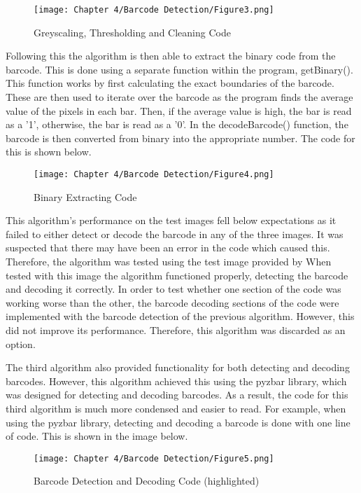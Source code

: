 \begin{figure}[H]        
    \centering
    \texttt{[image: Chapter 4/Barcode Detection/Figure3.png]}
    \caption{Greyscaling, Thresholding and Cleaning Code}
    \label{fig:bc3}
\end{figure} 

Following this the algorithm is then able to extract the binary code from the barcode.
This is done using a separate function within the program, getBinary().
This function works by first calculating the exact boundaries of the barcode.
These are then used to iterate over the barcode as the program finds the average value of the pixels in each bar.
Then, if the average value is high, the bar is read as a '1', otherwise, the bar is read as a '0'.
In the decodeBarcode() function, the barcode is then converted from binary into the appropriate number.
The code for this is shown below.

\begin{figure}[H]        
    \centering
    \texttt{[image: Chapter 4/Barcode Detection/Figure4.png]}
    \caption{Binary Extracting Code}
    \label{fig:bc4}
\end{figure} 

This algorithm's performance on the test images fell below expectations as it failed to either detect or decode the barcode in any of the three images.
It was suspected that there may have been an error in the code which caused this.
Therefore, the algorithm was tested using the test image provided by \cite{ryan_zabad_vaughan_2019}
When tested with this image the algorithm functioned properly, detecting the barcode and decoding it correctly.
In order to test whether one section of the code was working worse than the other, the barcode decoding sections of the code were implemented with the barcode detection of the previous algorithm.
However, this did not improve its performance.
Therefore, this algorithm was discarded as an option.

The third algorithm \cite{rockikz_2020} also provided functionality for both detecting and decoding barcodes.
However, this algorithm achieved this using the pyzbar library, which was designed for detecting and decoding barcodes.
As a result, the code for this third algorithm is much more condensed and easier to read.
For example, when using the pyzbar library, detecting and decoding a barcode is done with one line of code.
This is shown in the image below.

\begin{figure}[H]        
    \centering
    \texttt{[image: Chapter 4/Barcode Detection/Figure5.png]}
    \caption{Barcode Detection and Decoding Code (highlighted)}
    \label{fig:bc5} 
\end{figure} 

